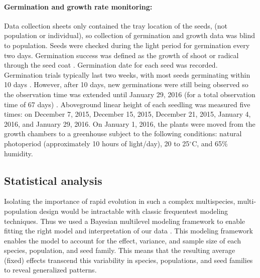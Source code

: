 \documentclass[12pt]{article}\usepackage[]{graphicx}\usepackage[]{color}
\begin{document}
	\paragraph{Germination and growth rate monitoring:}  Data collection sheets only contained the tray location of the seeds, (not population or individual), so collection of germination and growth data was blind to population. Seeds were checked during the light period for germination every two days. Germination success was defined as the growth of shoot or radical through the seed coat \parencite{Baskin1998,Popay1970}. Germination date for each seed was recorded.  Germination trials typically last two weeks, with most seeds germinating within 10 days \parencite{Baskin1998}. However, after 10 days, new germinations were still being observed so the observation time was extended until January 29, 2016 (for a total observation time of 67 days) \parencite{Wulff1994}. 	Aboveground linear height of each seedling was measured five times: on December 7, 2015, December 15, 2015, December 21, 2015, January 4, 2016, and January 29, 2016. On January 1, 2016, the plants were moved from the growth chambers to a greenhouse subject to the following conditions: natural photoperiod (approximately 10 hours of light/day), 20 to 25$^\circ$C, and 65\% humidity.
	
	\subsection{Statistical analysis} %
	Isolating the importance of rapid evolution in such a complex multispecies, multi-population design would be intractable with classic frequentest modeling  techniques. Thus we used a Bayesian multilevel modeling framework to enable fitting the right model and interpretation of our data \parencite{Carpenter2017}. This modeling framework enables the model to account for the effect, variance, and sample size of each species, population, and seed family. This means that the resulting average (fixed) effects transcend this variability in species, populations, and seed families to reveal generalized patterns. 
	
\end{document}
